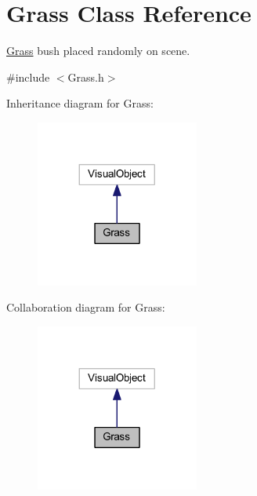 \hypertarget{class_grass}{}\section{Grass Class Reference}
\label{class_grass}


\mbox{\hyperlink{class_grass}{Grass}} bush placed randomly on scene.  




{\ttfamily \#include $<$Grass.\+h$>$}



Inheritance diagram for Grass\+:\nopagebreak
\begin{figure}[H]
\begin{center}
\leavevmode
\includegraphics[width=152pt]{class_grass__inherit__graph}
\end{center}
\end{figure}


Collaboration diagram for Grass\+:\nopagebreak
\begin{figure}[H]
\begin{center}
\leavevmode
\includegraphics[width=152pt]{class_grass__coll__graph}
\end{center}
\end{figure}
